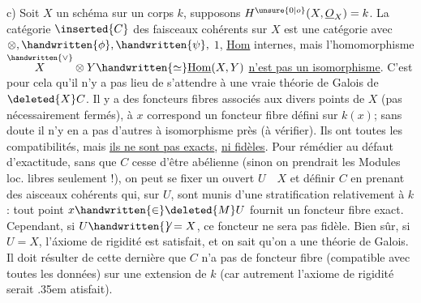 
c) Soit $X$ un schéma  sur un corps $k$, supposons $H^{\unsure{0|o}}(X,\underline{O}_{X})=k$. La catégorie $\inserted{C}$ des faisceaux cohérents sur $X$ est une catégorie avec $\otimes,\handwritten{\phi},\handwritten{\psi},$  $1$, \uline{Hom} internes,  mais l'homomorphisme $\overset{\handwritten{\vee}}{X}\otimes Y\handwritten{\simeq}\underline{\mathrm{Hom}}(X,Y)$ \uline{n'est pas un isomorphisme}. C'est pour cela qu'il n'y a pas lieu de s'attendre à une vraie théorie de Galois de $\deleted{X}C$. Il y a des foncteurs fibres associés aux divers points de $X$ (pas nécessairement fermés), à $x$ correspond un foncteur fibre défini sur $k(x)$; sans doute il n'y en a pas d'autres à isomorphisme près (à vérifier). Ils ont toutes les compatibilités, mais \uline{ils ne sont pas exacts},  \uline{ni fidèles}. Pour rémédier au défaut d'exactitude, sans que $C$ cesse d'être abélienne (sinon on prendrait les Modules loc. libres seulement !), on peut se fixer un ouvert $U\quad X$ et définir $C$ en prenant des aisceaux cohérents qui, sur $U$, sont munis d'une stratification relativement à $k$: tout point $x\handwritten{\in}\deleted{M}U$ fournit un foncteur fibre exact. Cependant, si $U\handwritten{\not}=X$, ce foncteur ne sera pas fidèle. Bien sûr, si $U=X$, l'áxiome de rigidité est satisfait, et on sait qu'on a une théorie de Galois. Il doit résulter de cette dernière que $C$ n'a pas de foncteur fibre (compatible avec toutes les données) sur une extension de $k$ (car autrement l'axiome de rigidité serait \kern.35em atisfait).

